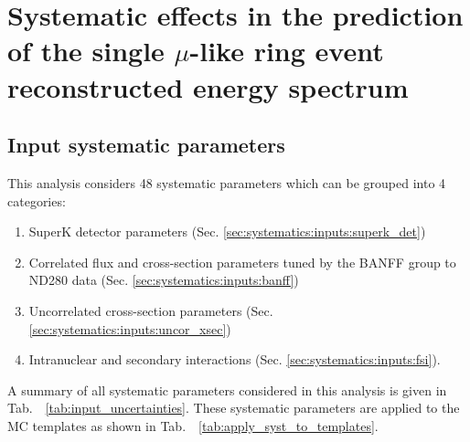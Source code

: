 \clearpage

\section {Systematic effects in the prediction of the single $\mu$-like ring event reconstructed energy spectrum}
\label{sec:systematics}


\subsection {Input systematic parameters}
\label{sec:systematics:inputs}

This analysis considers 48 systematic parameters which can be grouped into 4 categories:
\begin{enumerate}
\item SuperK detector parameters (Sec. \ref{sec:systematics:inputs:superk_det})
\item Correlated flux and cross-section parameters tuned by the BANFF group to ND280 data (Sec. \ref{sec:systematics:inputs:banff})
\item Uncorrelated cross-section parameters (Sec. \ref{sec:systematics:inputs:uncor_xsec})
\item Intranuclear and secondary interactions (Sec. \ref{sec:systematics:inputs:fsi}).
\end{enumerate}
A summary of all systematic parameters considered in this analysis is given in Tab.\ \ \ref{tab:input_uncertainties}.
These systematic parameters are applied to the MC templates as shown in Tab.\ \ \ref{tab:apply_syst_to_templates}.

%
%

